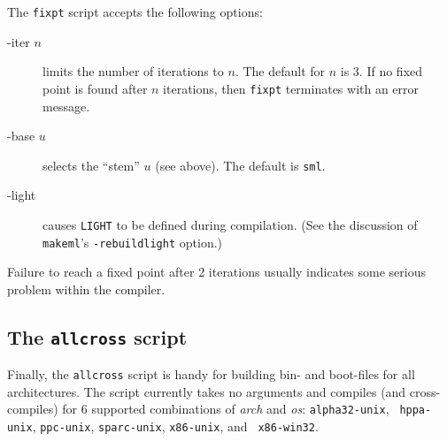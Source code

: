 The {\tt fixpt} script accepts the following options:

\begin{description}
\item[-iter $n$] limits the number of iterations to $n$.  The default
for $n$ is 3.  If no fixed point is found after $n$ iterations, then
{\tt fixpt} terminates with an error message.
\item[-base $u$] selects the ``stem'' $u$ (see above).  The default is
{\tt sml}.
\item[-light] causes {\tt LIGHT} to be defined during compilation.
(See the discussion of {\tt makeml}'s {\tt -rebuildlight} option.)
\end{description}

Failure to reach a fixed point after 2 iterations usually indicates
some serious problem within the compiler.

\subsection{The {\tt allcross} script}

Finally, the {\tt allcross} script is handy for building bin- and
boot-files for all architectures.  The script currently takes no
arguments and compiles (and cross-compiles) for 6 supported
combinations of {\it arch} and {\it os}: {\tt alpha32-unix}, {\tt
hppa-unix}, {\tt ppc-unix}, {\tt sparc-unix}, {\tt x86-unix}, and {\tt
x86-win32}.
